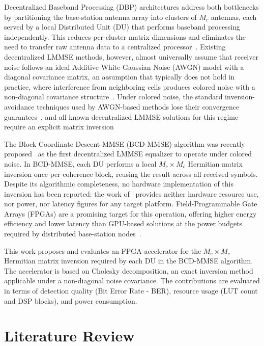 \documentclass[12pt]{article}
\begin{document}
Decentralized Baseband Processing (DBP) architectures address both bottlenecks
by partitioning the base-station antenna array into clusters of $M_c$ antennas, each served by a local
Distributed Unit (DU) that performs baseband processing independently. This
reduces per-cluster matrix dimensions and eliminates the need to transfer raw
antenna data to a centralized processor~\cite{jeon2019}. Existing decentralized
LMMSE methods, however, almost universally assume that receiver noise follows an ideal
Additive White Gaussian Noise (AWGN) model with a diagonal covariance matrix,
an assumption that typically does not hold in practice, where interference from neighboring
cells produces colored noise with a non-diagonal covariance
structure~\cite{zhao2025jsac}. Under colored noise, the standard
inversion-avoidance techniques used by AWGN-based methods lose their convergence
guarantees~\cite{wang2023bdnsepa}, and all known decentralized LMMSE solutions
for this regime require an explicit matrix inversion
 
The Block Coordinate Descent
MMSE (BCD-MMSE) algorithm was recently proposed~\cite{zhao2025jsac} as the first decentralized LMMSE equalizer to operate
under colored noise. In BCD-MMSE, each DU performs a local $M_c \times M_c$
Hermitian matrix inversion once per coherence block, reusing the result across
all received symbols. Despite its algorithmic completeness, no hardware
implementation of this inversion has been reported: the work
of~\cite{zhao2025jsac} provides neither hardware resource use, nor power, nor latency
figures for any target platform. Field-Programmable Gate Arrays (FPGAs) are
a promising target for this operation, offering higher energy efficiency and
lower latency than GPU-based solutions at the power budgets required by
distributed base-station nodes~\cite{jeon2019,li2019cd}.

This work proposes and evaluates an FPGA accelerator for the $M_c \times M_c$
Hermitian matrix inversion required by each DU in the BCD-MMSE algorithm. The
accelerator is based on Cholesky decomposition, an exact inversion method
applicable under a non-diagonal noise covariance. The contributions are
evaluated in terms of detection quality (Bit Error Rate - BER), resource usage
(LUT count and DSP blocks), and power consumption.


\section{Literature Review}
\label{sec:review}
\end{document}
